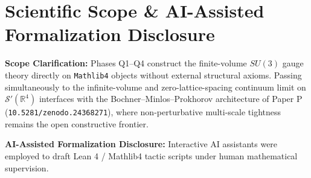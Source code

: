 \documentclass[11pt,a4paper]{article}
\begin{document}
\section{Scientific Scope \& AI-Assisted Formalization Disclosure}
\textbf{Scope Clarification:} Phases Q1--Q4 construct the finite-volume $SU(3)$ gauge theory directly on \texttt{Mathlib4} objects without external structural axioms. Passing simultaneously to the infinite-volume and zero-lattice-spacing continuum limit on $\mathcal{S}'(\mathbb{R}^4)$ interfaces with the Bochner--Minlos--Prokhorov architecture of Paper P (\texttt{10.5281/zenodo.24368271}), where non-perturbative multi-scale tightness remains the open constructive frontier.

\textbf{AI-Assisted Formalization Disclosure:} Interactive AI assistants were employed to draft Lean 4 / Mathlib4 tactic scripts under human mathematical supervision.
\end{document}
